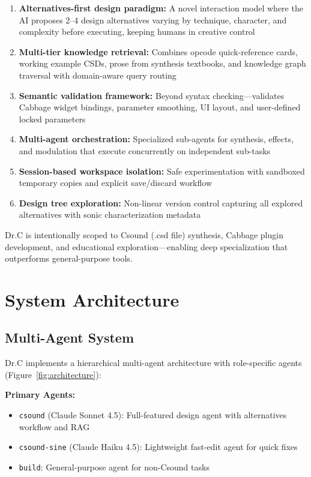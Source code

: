\documentclass[a4paper]{article}
\begin{document}
\begin{enumerate}
\item \textbf{Alternatives-first design paradigm:} A novel interaction model where the AI proposes 2--4 design alternatives varying by technique, character, and complexity before executing, keeping humans in creative control
\item \textbf{Multi-tier knowledge retrieval:} Combines opcode quick-reference cards, working example CSDs, prose from synthesis textbooks, and knowledge graph traversal with domain-aware query routing
\item \textbf{Semantic validation framework:} Beyond syntax checking—validates Cabbage widget bindings, parameter smoothing, UI layout, and user-defined locked parameters
\item \textbf{Multi-agent orchestration:} Specialized sub-agents for synthesis, effects, and modulation that execute concurrently on independent sub-tasks
\item \textbf{Session-based workspace isolation:} Safe experimentation with sandboxed temporary copies and explicit save/discard workflow
\item \textbf{Design tree exploration:} Non-linear version control capturing all explored alternatives with sonic characterization metadata
\end{enumerate}

Dr.C is intentionally scoped to Csound (.csd file) synthesis, Cabbage plugin development, and educational exploration—enabling deep specialization that outperforms general-purpose tools.

\section{System Architecture}
\label{sec:architecture}

\subsection{Multi-Agent System}

Dr.C implements a hierarchical multi-agent architecture with role-specific agents (Figure~\ref{fig:architecture}):

\textbf{Primary Agents:}
\begin{itemize}
\item \texttt{csound} (Claude Sonnet 4.5): Full-featured design agent with alternatives workflow and RAG
\item \texttt{csound-sine} (Claude Haiku 4.5): Lightweight fast-edit agent for quick fixes
\item \texttt{build}: General-purpose agent for non-Csound tasks
\end{itemize}
\end{document}
